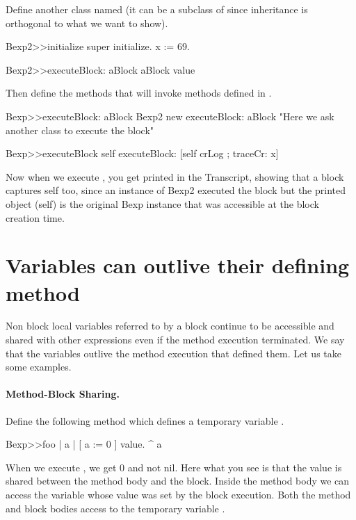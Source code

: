 \documentclass[a4paper,10pt,twoside]{book}
\begin{document}
Define another class named  (it can be a subclass of  since inheritance is orthogonal to what we want to show).

\begin{code}{}
Bexp2>>initialize
	super initialize.
	x := 69.

Bexp2>>executeBlock: aBlock
	aBlock value
\end{code}

Then define the methods that will invoke  methods defined in .
\begin{code}{}
Bexp>>executeBlock: aBlock
	Bexp2 new executeBlock: aBlock "Here we ask another class to execute the block"

Bexp>>executeBlock
	self executeBlock: [self crLog ; traceCr: x]
\end{code}

Now when we execute , you get  printed in the Transcript, showing that a block captures self too, since an instance of Bexp2 executed the block but the printed object (self) is the original Bexp instance that was accessible at the block creation time.


\section{Variables can outlive their defining method}

Non block local variables referred to by a block continue to be accessible and shared with other expressions even if the method execution terminated. We say that the variables outlive the method execution that defined them.
Let us take some examples.

\paragraph{Method-Block Sharing.} Define the following method  which defines a temporary variable .

\begin{code}{}
Bexp>>foo
	| a |
	[ a := 0 ] value.
	^ a
\end{code}

When we execute , we get 0 and not nil.
Here what you see is that the value is shared between the method body and the block. Inside the method body we can access the variable whose value was set by the block execution.
Both the method  and block bodies access to the temporary variable .
\end{document}
